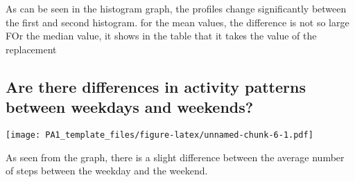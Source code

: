 \documentclass[]{article}
\newenvironment{Shaded}{\begin{snugshade}}{\end{snugshade}}
\newcommand{\KeywordTok}[1]{\textcolor[rgb]{0.13,0.29,0.53}{\textbf{{#1}}}}
\newcommand{\DataTypeTok}[1]{\textcolor[rgb]{0.13,0.29,0.53}{{#1}}}
\newcommand{\DecValTok}[1]{\textcolor[rgb]{0.00,0.00,0.81}{{#1}}}
\newcommand{\FloatTok}[1]{\textcolor[rgb]{0.00,0.00,0.81}{{#1}}}
\newcommand{\StringTok}[1]{\textcolor[rgb]{0.31,0.60,0.02}{{#1}}}
\newcommand{\NormalTok}[1]{{#1}}
\begin{document}
As can be seen in the histogram graph, the profiles change significantly
between the first and second histogram. for the mean values, the
difference is not so large FOr the median value, it shows in the table
that it takes the value of the replacement

\subsection{Are there differences in activity patterns between weekdays
and
weekends?}\label{are-there-differences-in-activity-patterns-between-weekdays-and-weekends}

\begin{Shaded}
\end{Shaded}

\texttt{[image: PA1\_template\_files/figure-latex/unnamed-chunk-6-1.pdf]}

As seen from the graph, there is a slight difference between the average
number of steps between the weekday and the weekend.
\end{document}

